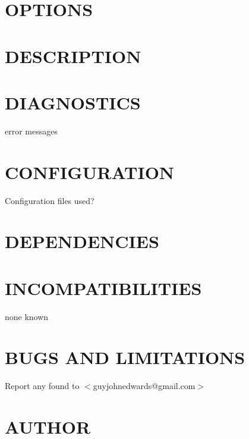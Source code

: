 \documentclass{book}
\begin{document}
\section{OPTIONS}
\label{_OPTIONS}
\hypertarget{_OPTIONS}{}


\section{DESCRIPTION}
\label{_DESCRIPTION}
\hypertarget{_DESCRIPTION}{}


\section{DIAGNOSTICS}
\label{_DIAGNOSTICS}
\hypertarget{_DIAGNOSTICS}{}



error messages


\section{CONFIGURATION}
\label{_CONFIGURATION}
\hypertarget{_CONFIGURATION}{}



Configuration files used?


\section{DEPENDENCIES}
\label{_DEPENDENCIES}
\hypertarget{_DEPENDENCIES}{}


\section{INCOMPATIBILITIES}
\label{_INCOMPATIBILITIES}
\hypertarget{_INCOMPATIBILITIES}{}



none known


\section{BUGS AND LIMITATIONS}
\label{_BUGS_AND_LIMITATIONS}
\hypertarget{_BUGS_AND_LIMITATIONS}{}



Report any found to $<$guyjohnedwards@gmail.com$>$


\section{AUTHOR}
\label{_AUTHOR}
\hypertarget{_AUTHOR}{}
\end{document}

